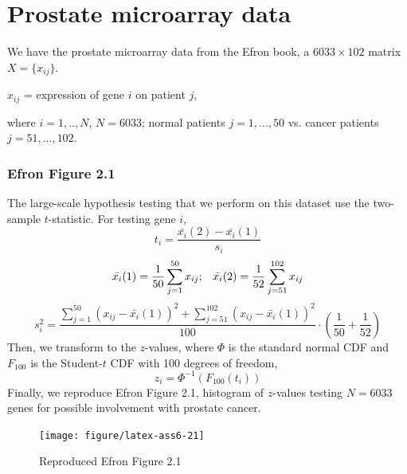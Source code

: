 \documentclass{article}\usepackage{graphicx, color}
\newenvironment{knitrout}{}{} %
\begin{document}
\newpage
\section*{Prostate microarray data}
\hspace{12 pt} We have the prostate microarray data from the Efron
book, a $6033 \times 102$ matrix $X=\{x_{ij}\}$.
\begin{center}
$x_{ij}$ = expression of gene $i$ on patient $j$, 
\end{center}
where $i=1,..,N$, $N=6033$; normal patients $j=1,...,50$ vs. cancer
patients $j=51,...,102$.




\subsubsection*{Efron Figure 2.1}
\hspace{12 pt} The large-scale hypothesis testing that we perform on
this dataset use the two-sample $t$-statistic. \newline
For testing gene $i$,
\begin{displaymath}
t_i = \frac{\bar{x_i}(2) - \bar{x_i}(1)}{s_i}
\end{displaymath}
\begin{displaymath}
\bar{x_i}(1) = \frac{1}{50} \sum_{j=1}^{50} x_{ij} ; \hspace{8 pt}
\bar{x_i}(2) = \frac{1}{52} \sum_{j=51}^{102} x_{ij}
\end{displaymath}
\begin{displaymath}
s_i^2 = \frac{\sum_{j=1}^{50} (x_{ij} - \bar{x_i}(1))^2 +
  \sum_{j=51}^{102} (x_{ij} - \bar{x_i}(1))^2 }{100} \cdot (\frac{1}{50} + \frac{1}{52}) 
\end{displaymath}
Then, we transform to the $z$-values, 
where $\Phi$ is the standard normal CDF and $F_{100}$ is the Student-$t$ CDF
with 100 degrees of freedom,
\begin{displaymath}
z_i = \Phi^{-1}(F_{100}(t_i))
\end{displaymath}
Finally, we reproduce Efron
Figure 2.1, histogram of $z$-values testing $N=6033$ genes
for possible involvement with prostate cancer.

\begin{knitrout}
\color{fgcolor}\begin{figure}[]


{\centering \texttt{[image: figure/latex-ass6-21]} 

}

\caption[Reproduced Efron Figure 2]{Reproduced Efron Figure 2.1\label{fig:ass6-21}}
\end{figure}


\end{knitrout}
\end{document}
